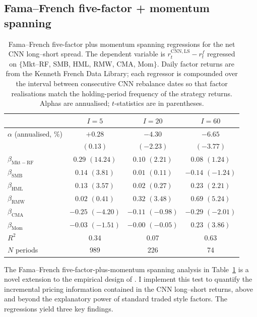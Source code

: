 \documentclass{article}
\begin{document}
\subsection{Fama--French five-factor + momentum spanning}

\begin{table}[H]
  \centering
  \caption{Fama--French five-factor plus momentum spanning regressions for
    the net CNN long--short spread. The dependent variable is
    $r_t^{\mathrm{CNN,LS}}-r_t^f$ regressed on
    $\{$Mkt--RF, SMB, HML, RMW, CMA, Mom$\}$. Daily factor returns are from the
    Kenneth French Data Library; each regressor is compounded over the interval
    between consecutive CNN rebalance dates so that factor realisations match the
    holding-period frequency of the strategy returns. Alphas are annualised;
    $t$-statistics are in parentheses.}
  \label{tab:ff6}
  \small
  \begin{tabular}{lccc}
    \toprule
                          & $I=5$ & $I=20$ & $I=60$ \\
    \midrule
    $\alpha$ (annualised, \%) & $+0.28$  & $-4.30$ & $-6.65$ \\
                              & $(0.13)$ & $(-2.23)$ & $(-3.77)$ \\
    $\beta_{\mathrm{Mkt-RF}}$ & $0.29$ $(14.24)$ & $0.10$ $(2.21)$ & $0.08$ $(1.24)$ \\
    $\beta_{\mathrm{SMB}}$    & $0.14$ $(3.81)$  & $0.01$ $(0.11)$ & $-0.14$ $(-1.24)$ \\
    $\beta_{\mathrm{HML}}$    & $0.13$ $(3.57)$  & $0.02$ $(0.27)$ & $0.23$ $(2.21)$ \\
    $\beta_{\mathrm{RMW}}$    & $0.02$ $(0.41)$  & $0.32$ $(3.48)$ & $0.69$ $(5.24)$ \\
    $\beta_{\mathrm{CMA}}$    & $-0.25$ $(-4.20)$ & $-0.11$ $(-0.98)$ & $-0.29$ $(-2.01)$ \\
    $\beta_{\mathrm{Mom}}$    & $-0.03$ $(-1.51)$ & $-0.00$ $(-0.05)$ & $0.23$ $(3.86)$ \\
    $R^{2}$                   & 0.34 & 0.07 & 0.63 \\
    $N$ periods               & 989  & 226  & 74   \\
    \bottomrule
  \end{tabular}
\end{table}

The Fama--French five-factor-plus-momentum spanning analysis in
Table~\ref{tab:ff6} is a novel extension to the empirical design of
\citet{jiang2023reimagining}. I implement this test to quantify the incremental
pricing information contained in the CNN long--short returns, above and beyond
the explanatory power of standard traded style factors.
The regressions yield three key findings.
\end{document}
